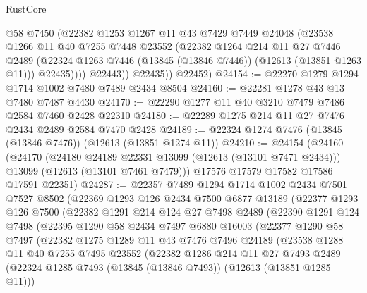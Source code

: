 \begin{lexlean}{RustCore}
\begin{coremodule}
                @58
                @7450
                (@22382
                  @1253
                  @1267
                  @11
                  @43
                  @7429
                  @7449
                  @24048
                  (@23538
                    @1266
                    @11
                    @40
                    @7255
                    @7448
                    @23552
                    (@22382
                      @1264
                      @214
                      @11
                      @27
                      @7446
                      @2489
                      (@22324 @1263 @7446 (@13845 (@13846 @7446)) (@12613 (@13851 @1263 @11)))
                      @22435))))
              @22443))
          @22435))
      @22452)
@24154 := @22270 @1279 @1294 @1714 @1002 @7480 @7489 @2434 @8504
@24160 := @22281 @1278 @43 @13 @7480 @7487 @4430
@24170 := @22290 @1277 @11 @40 @3210 @7479 @7486 @2584 @7460 @2428 @22310
@24180 := @22289 @1275 @214 @11 @27 @7476 @2434 @2489 @2584 @7470 @2428
@24189 := @22324 @1274 @7476 (@13845 (@13846 @7476)) (@12613 (@13851 @1274 @11))
@24210 := @24154
    (@24160
      (@24170
        (@24180 @24189 @22331 @13099 (@12613 (@13101 @7471 @2434)))
        @13099
        (@12613 (@13101 @7461 @7479)))
      @17576
      @17579
      @17582
      @17586
      @17591
      @22351)
@24287 := @22357
    @7489
    @1294
    @1714
    @1002
    @2434
    @7501
    @7527
    @8502
    (@22369
      @1293
      @126
      @2434
      @7500
      @6877
      @13189
      (@22377
        @1293
        @126
        @7500
        (@22382
          @1291
          @214
          @124
          @27
          @7498
          @2489
          (@22390
            @1291
            @124
            @7498
            (@22395
              @1290
              @58
              @2434
              @7497
              @6880
              @16003
              (@22377
                @1290
                @58
                @7497
                (@22382
                  @1275
                  @1289
                  @11
                  @43
                  @7476
                  @7496
                  @24189
                  (@23538
                    @1288
                    @11
                    @40
                    @7255
                    @7495
                    @23552
                    (@22382
                      @1286
                      @214
                      @11
                      @27
                      @7493
                      @2489
                      (@22324 @1285 @7493 (@13845 (@13846 @7493)) (@12613 (@13851 @1285 @11)))

\end{coremodule}
\end{lexlean}
